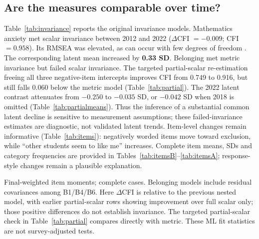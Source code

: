 \documentclass[preprint,12pt,authoryear,nonatbib]{elsarticle}
\let\citep\parencite
\begin{document}
\subsection{Are the measures comparable over time?}
Table~\ref{tab:invariance} reports the original invariance models. Mathematics anxiety met scalar invariance between 2012 and 2022 ($\Delta$CFI $= -0.009$; CFI $= 0.958$). Its RMSEA was elevated, as can occur with few degrees of freedom \citep{kenny2015}. The corresponding latent mean increased by \textbf{0.33 SD}. Belonging met metric invariance but failed scalar invariance. The targeted partial-scalar re-estimation freeing all three negative-item intercepts improves CFI from 0.749 to 0.916, but still falls 0.060 below the metric model (Table~\ref{tab:partial}). The 2022 latent contrast attenuates from $-0.250$ to $-0.035$ SD, or $-0.042$ SD when 2018 is omitted (Table~\ref{tab:partialmeans}). Thus the inference of a substantial common latent decline is sensitive to measurement assumptions; these failed-invariance estimates are diagnostic, not validated latent trends. Item-level changes remain informative (Table~\ref{tab:items}): negatively worded items move toward exclusion, while ``other students seem to like me'' increases. Complete item means, SDs and category frequencies are provided in Tables~\ref{tab:itemsB}--\ref{tab:itemsA}; response-style changes remain a plausible explanation.

\begin{table}[H]\centering\scriptsize
\caption{Measurement invariance, Viet Nam (multi-group CFA, ML on weighted moments)}\label{tab:invariance}

\par\smallskip\raggedright\footnotesize Final-weighted item moments; complete cases. Belonging models include residual covariances among B1/B4/B6. Here $\Delta$CFI is relative to the previous nested model, with earlier partial-scalar rows showing improvement over full scalar only; those positive differences do not establish invariance. The targeted partial-scalar check in Table~\ref{tab:partial} compares directly with metric. These ML fit statistics are not survey-adjusted tests.
\end{table}

\begin{table}[H]\centering\footnotesize
\caption{Viet Nam: belonging items, percentage giving the belonging response}\label{tab:items}

\end{table}
\end{document}
